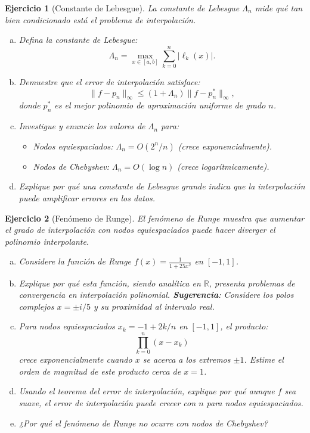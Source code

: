 \documentclass[12pt]{article}
\newtheorem{exercise}{Ejercicio}
\begin{document}
\begin{exercise}[Constante de Lebesgue]
La constante de Lebesgue $\Lambda_n$ mide qué tan bien condicionado está el problema de interpolación.
\begin{enumerate}[(a)]
\item Defina la constante de Lebesgue:
\[
\Lambda_n = \max_{x \in [a,b]} \sum_{k=0}^n |\ell_k(x)|.
\]
\item Demuestre que el error de interpolación satisface:
\[
\|f - p_n\|_\infty \leq (1 + \Lambda_n) \|f - p_n^*\|_\infty,
\]
donde $p_n^*$ es el mejor polinomio de aproximación uniforme de grado $n$.
\item Investigue y enuncie los valores de $\Lambda_n$ para:
   \begin{itemize}
   \item Nodos equiespaciados: $\Lambda_n = O(2^n / n)$ (crece exponencialmente).
   \item Nodos de Chebyshev: $\Lambda_n = O(\log n)$ (crece logarítmicamente).
   \end{itemize}
\item Explique por qué una constante de Lebesgue grande indica que la interpolación puede amplificar errores en los datos.
\end{enumerate}
\end{exercise}

\begin{exercise}[Fenómeno de Runge]
El fenómeno de Runge muestra que aumentar el grado de interpolación con nodos equiespaciados puede hacer diverger el polinomio interpolante.
\begin{enumerate}[(a)]
\item Considere la función de Runge $f(x) = \frac{1}{1 + 25x^2}$ en $[-1, 1]$.
\item Explique por qué esta función, siendo analítica en $\mathbb{R}$, presenta problemas de convergencia en interpolación polinomial.
\textbf{Sugerencia}: Considere los polos complejos $x = \pm i/5$ y su proximidad al intervalo real.
\item Para nodos equiespaciados $x_k = -1 + 2k/n$ en $[-1, 1]$, el producto:
\[
\prod_{k=0}^n (x - x_k)
\]
crece exponencialmente cuando $x$ se acerca a los extremos $\pm 1$. Estime el orden de magnitud de este producto cerca de $x = 1$.
\item Usando el teorema del error de interpolación, explique por qué aunque $f$ sea suave, el error de interpolación puede crecer con $n$ para nodos equiespaciados.
\item ¿Por qué el fenómeno de Runge no ocurre con nodos de Chebyshev?
\end{enumerate}
\end{exercise}
\end{document}
